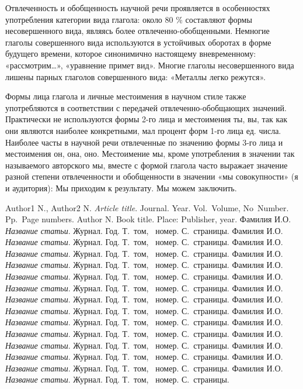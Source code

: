 \documentclass[12pt]{llncs}
\begin{document}
Отвлеченность и обобщенность научной речи проявляется в особенностях употребления категории вида глагола: около 80 \% составляют формы несовершенного вида, являясь более отвлеченно-обобщенными. Немногие глаголы совершенного вида используются в устойчивых оборотах в форме будущего времени, которое синонимично настоящему вневременному: «рассмотрим…», «уравнение примет вид». Многие глаголы несовершенного вида лишены парных глаголов совершенного вида: «Металлы легко режутся».

Формы лица глагола и личные местоимения в научном стиле также употребляются в соответствии с передачей отвлеченно-обобщающих значений. Практически не используются формы 2-го лица и местоимения ты, вы, так как они являются наиболее конкретными, мал процент форм 1-го лица ед. числа. Наиболее часты в научной речи отвлеченные по значению формы 3-го лица и местоимения он, она, оно. Местоимение мы, кроме употребления в значении так называемого авторского мы, вместе с формой глагола часто выражает значение разной степени отвлеченности и обобщенности в значении «мы совокупности» (я и аудитория): Мы приходим к результату. Мы можем заключить.


\begin{thebibliography}{99}
Author1 N., Author2 N.  {\it Article title}. Journal. Year. Vol.~Volume, No~Number. Pp.~Page numbers.
Author N. Book title. Place: Publisher, year.
 Фамилия И.О. {\it Название статьи}. Журнал. Год. Т.~том,  \textnumero~номер. С.~страницы.
 Фамилия И.О. {\it Название статьи}. Журнал. Год. Т.~том,  \textnumero~номер. С.~страницы.
 Фамилия И.О. {\it Название статьи}. Журнал. Год. Т.~том,  \textnumero~номер. С.~страницы.
 Фамилия И.О. {\it Название статьи}. Журнал. Год. Т.~том,  \textnumero~номер. С.~страницы.
 Фамилия И.О. {\it Название статьи}. Журнал. Год. Т.~том,  \textnumero~номер. С.~страницы.
 Фамилия И.О. {\it Название статьи}. Журнал. Год. Т.~том,  \textnumero~номер. С.~страницы.
 Фамилия И.О. {\it Название статьи}. Журнал. Год. Т.~том,  \textnumero~номер. С.~страницы.
 Фамилия И.О. {\it Название статьи}. Журнал. Год. Т.~том,  \textnumero~номер. С.~страницы.
 Фамилия И.О. {\it Название статьи}. Журнал. Год. Т.~том,  \textnumero~номер. С.~страницы.
 Фамилия И.О. {\it Название статьи}. Журнал. Год. Т.~том,  \textnumero~номер. С.~страницы.
 Фамилия И.О. {\it Название статьи}. Журнал. Год. Т.~том,  \textnumero~номер. С.~страницы.
 Фамилия И.О. {\it Название статьи}. Журнал. Год. Т.~том,  \textnumero~номер. С.~страницы.
 Фамилия И.О. {\it Название статьи}. Журнал. Год. Т.~том,  \textnumero~номер. С.~страницы.
 Фамилия И.О. {\it Название статьи}. Журнал. Год. Т.~том,  \textnumero~номер. С.~страницы.
\end{thebibliography}
\end{document}
